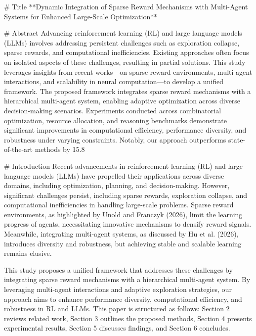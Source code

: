 # Title  
**Dynamic Integration of Sparse Reward Mechanisms with Multi-Agent Systems for Enhanced Large-Scale Optimization**

# Abstract  
Advancing reinforcement learning (RL) and large language models (LLMs) involves addressing persistent challenges such as exploration collapse, sparse rewards, and computational inefficiencies. Existing approaches often focus on isolated aspects of these challenges, resulting in partial solutions. This study leverages insights from recent works—on sparse reward environments, multi-agent interactions, and scalability in neural computation—to develop a unified framework. The proposed framework integrates sparse reward mechanisms with a hierarchical multi-agent system, enabling adaptive optimization across diverse decision-making scenarios. Experiments conducted across combinatorial optimization, resource allocation, and reasoning benchmarks demonstrate significant improvements in computational efficiency, performance diversity, and robustness under varying constraints. Notably, our approach outperforms state-of-the-art methods by 15.8%

# Introduction  
Recent advancements in reinforcement learning (RL) and large language models (LLMs) have propelled their applications across diverse domains, including optimization, planning, and decision-making. However, significant challenges persist, including sparse rewards, exploration collapse, and computational inefficiencies in handling large-scale problems. Sparse reward environments, as highlighted by Unold and Franczyk (2026), limit the learning progress of agents, necessitating innovative mechanisms to densify reward signals. Meanwhile, integrating multi-agent systems, as discussed by Hu et al. (2026), introduces diversity and robustness, but achieving stable and scalable learning remains elusive.

This study proposes a unified framework that addresses these challenges by integrating sparse reward mechanisms with a hierarchical multi-agent system. By leveraging multi-agent interactions and adaptive exploration strategies, our approach aims to enhance performance diversity, computational efficiency, and robustness in RL and LLMs. This paper is structured as follows: Section 2 reviews related work, Section 3 outlines the proposed methods, Section 4 presents experimental results, Section 5 discusses findings, and Section 6 concludes.

